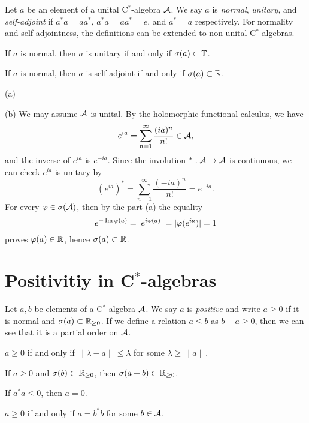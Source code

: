 \documentclass{../../large}
\begin{document}
\begin{prb}
Let $a$ be an element of a unital C$^*$-algebra $\mathcal{A}$.
We say $a$ is \emph{normal}, \emph{unitary}, and \emph{self-adjoint} if $a^*a=aa^*$, $a^*a=aa^*=e$, and $a^*=a$ respectively.
For normality and self-adjointness, the definitions can be extended to non-unital C$^*$-algebras.
\begin{parts}
\item If $a$ is normal, then $a$ is unitary if and only if $\sigma(a)\subset\mathbb{T}$.
\item If $a$ is normal, then $a$ is self-adjoint if and only if $\sigma(a)\subset\mathbb{R}$.
\end{parts}
\end{prb}
\begin{pf}
(a)

(b)
We may assume $\mathcal{A}$ is unital.
By the holomorphic functional calculus, we have
\[e^{ia}=\sum_{n=1}^\infty\frac{(ia)^n}{n!}\in\mathcal{A},\]
and the inverse of $e^{ia}$ is $e^{-ia}$.
Since the involution $^*:\mathcal{A}\to\mathcal{A}$ is continuous, we can check $e^{ia}$ is unitary by
\[(e^{ia})^*=\sum_{n=1}^\infty\frac{(-ia)^n}{n!}=e^{-ia}.\]
For every $\varphi\in\sigma(\mathcal{A})$, then by the part (a) the equality
\[e^{-\operatorname{Im}\varphi(a)}=|e^{i\varphi(a)}|=|\varphi(e^{ia})|=1\]
proves $\varphi(a)\in\mathbb{R}$, hence $\sigma(a)\subset\mathbb{R}$.
\end{pf}



\section{Positivitiy in C$^*$-algebras}


\begin{prb}
Let $a,b$ be elements of a C$^*$-algebra $\mathcal{A}$.
We say $a$ is \emph{positive} and write $a\ge0$ if it is normal and $\sigma(a)\subset\mathbb{R}_{\ge0}$.
If we define a relation $a\le b$ as $b-a\ge0$, then we can see that it is a partial order on $\mathcal{A}$.
\begin{parts}
\item $a\ge0$ if and only if $\|\lambda-a\|\le\lambda$ for some $\lambda\ge\|a\|$.
\item If $a\ge0$ and $\sigma(b)\subset\mathbb{R}_{\ge0}$, then $\sigma(a+b)\subset\mathbb{R}_{\ge0}$.
\item If $a^*a\le0$, then $a=0$.
\item $a\ge0$ if and only if $a=b^*b$ for some $b\in\mathcal{A}$.
\end{parts}
\end{prb}
\begin{pf}

\end{pf}
\end{document}
